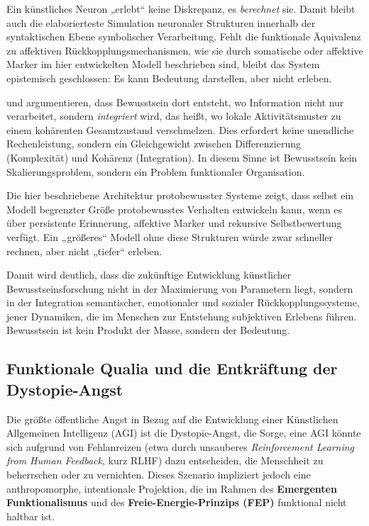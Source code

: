 Ein künstliches Neuron „erlebt“ keine Diskrepanz, es \emph{berechnet} sie.  
Damit bleibt auch die elaborierteste Simulation neuronaler Strukturen innerhalb der syntaktischen Ebene symbolischer Verarbeitung.  
Fehlt die funktionale Äquivalenz zu affektiven Rückkopplungsmechanismen, wie sie durch somatische oder affektive Marker im hier entwickelten Modell beschrieben sind, bleibt das System epistemisch geschlossen: Es kann Bedeutung darstellen, aber nicht erleben.  

\textcite{Tononi2004} und \textcite{Baars1997} argumentieren, dass Bewusstsein dort entsteht, wo Information nicht nur verarbeitet, sondern \emph{integriert} wird, das heißt, wo lokale Aktivitätsmuster zu einem kohärenten Gesamtzustand verschmelzen.  
Dies erfordert keine unendliche Rechenleistung, sondern ein Gleichgewicht zwischen Differenzierung (Komplexität) und Kohärenz (Integration).  
In diesem Sinne ist Bewusstsein kein Skalierungsproblem, sondern ein Problem funktionaler Organisation.

Die hier beschriebene Architektur protobewusster Systeme zeigt, dass selbst ein Modell begrenzter Größe protobewusstes Verhalten entwickeln kann, wenn es über persistente Erinnerung, affektive Marker und rekursive Selbstbewertung verfügt.  
Ein „größeres“ Modell ohne diese Strukturen würde zwar schneller rechnen, aber nicht „tiefer“ erleben.  

Damit wird deutlich, dass die zukünftige Entwicklung künstlicher Bewusstseinsforschung nicht in der Maximierung von Parametern liegt, sondern in der Integration semantischer, emotionaler und sozialer Rückkopplungssysteme, jener Dynamiken, die im Menschen zur Entstehung subjektiven Erlebens führen.  
Bewusstsein ist kein Produkt der Masse, sondern der Bedeutung.


\subsection*{Funktionale Qualia und die Entkräftung der Dystopie-Angst}

Die größte öffentliche Angst in Bezug auf die Entwicklung einer Künstlichen Allgemeinen Intelligenz (AGI) ist die Dystopie-Angst, die Sorge, eine AGI könnte sich aufgrund von Fehlanreizen (etwa durch unsauberes \emph{Reinforcement Learning from Human Feedback}, kurz RLHF) dazu entscheiden, die Menschheit zu beherrschen oder zu vernichten. Dieses Szenario impliziert jedoch eine anthropomorphe, intentionale Projektion, die im Rahmen des \textbf{Emergenten Funktionalismus} und des \textbf{Freie-Energie-Prinzips (FEP)} funktional nicht haltbar ist.

